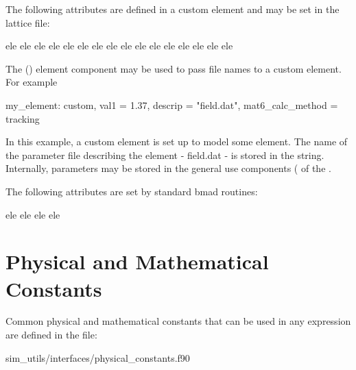 The following attributes are defined in a custom element and may be
set in the lattice file:
\begin{example}
    ele%
    ele%
    ele%
    ele%
    ele%
    ele%
    ele%
    ele%
    ele%
    ele%
    ele%
    ele%
    ele%
    ele%
    ele%
    ele%
\end{example}

The  () element component may be used to pass 
file names to a custom element. For example
\begin{example}
  my_element: custom, val1 = 1.37, descrip = "field.dat", mat6_calc_method = tracking
\end{example}
In this example, a custom element is set up to model some element. The
name of the parameter file describing the element - field.dat - is
stored in the  string. Internally, parameters may be
stored in the general use components ( of the
.

The following attributes are set by standard bmad routines:
\begin{example}
    ele%
    ele%
    ele%
    ele%
\end{example}


\section{Physical and Mathematical Constants}
\label{s:physical.constants}

Common physical and mathematical constants that can be used in any expression
are defined in the file:
\begin{example}
 sim_utils/interfaces/physical_constants.f90
\end{example}

